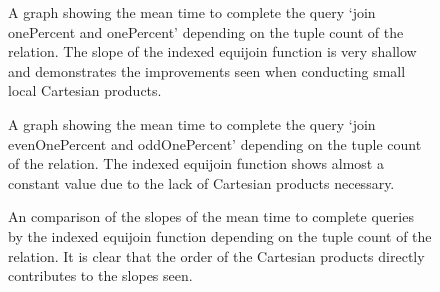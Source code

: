 \begin{figure}[p]
    
    \caption{A graph showing the mean time to complete the query `join
    onePercent and onePercent' depending on the tuple count of the relation. The
slope of the indexed equijoin function is very shallow and demonstrates the
improvements seen when conducting small local Cartesian products.}
    \label{fig:benchmark:onePercent-onePercent-tuples}
\end{figure}

\begin{figure}[p]
    
    \caption{A graph showing the mean time to complete the query `join
    evenOnePercent and oddOnePercent' depending on the tuple count of the
relation. The indexed equijoin function shows almost a constant value due to the
lack of Cartesian products necessary.}
    \label{fig:benchmark:evenOnePercent-oddOnePercent-tuples}
\end{figure}

\begin{figure}[p]
    
    \caption{An comparison of the slopes of the mean time to complete queries by
    the indexed equijoin function depending on the tuple count of the relation.
It is clear that the order of the Cartesian products directly contributes to the
slopes seen.}
    \label{fig:benchmark:indexed-equijoin-query-comparison}
\end{figure}
